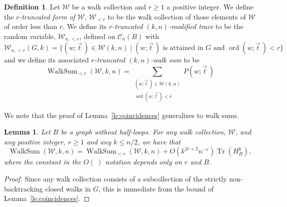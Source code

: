 \documentclass{memo-l}
\newenvironment{jfnote}{ \bgroup \color{blue} }{\egroup}
\newcommand{\mynote}[1]{\begin{jfnote}#1\end{jfnote}}
\theoremstyle{plain}
\theoremstyle{definition}
\numberwithin{section}{chapter}
\numberwithin{equation}{chapter}
\DeclareMathOperator{\ord}{ord}
\DeclareMathOperator{\WalkSum}{WalkSum}
\DeclareMathOperator{\Tr}{Tr}
\newcommand{\potwalk}{(w;\vec t\,)}
\theoremstyle{plain}
\newtheorem{lem}[theorem]{Lemma}
\theoremstyle{definition}
\newtheorem{defn}[theorem]{Definition}
\newcommand\cC{\mathcal{C}}
\newcommand\cW{\mathcal{W}}
\begin{document}
\begin{defn}\label{de:truncate_walk_collections}
Let \( \cW \) be a walk collection and \(r \geq 1\) a positive
integer. 
We define the {\em $r$-truncated form of $\cW$},
$\cW_{<r}$ to be the walk collection
of those elements of $\cW$ of order less than $r$.
We define its \emph{\(r\)-truncated \( (k,n) \)-modified trace} to
be the random variable, \( \cW_{n, <r} \), defined on \( \cC_n(B) \) with
\[ \cW_{n,<r}(G,k) = \{ \potwalk \in \cW(k,n) \mid \potwalk \text{ is
attained in } G \text{ and } \ord\potwalk < r \} \] and we define its
associated \emph{\(r\)-truncated \((k,n)\)-walk sum} to be \[
\WalkSum_{<r}(\cW,k,n) = \sum_{\substack{\potwalk \in \cW(k,n)\\
\ord\potwalk < r}}\!\!\!\!\! P\potwalk \] \end{defn}


We note that the proof of Lemma~\ref{le:coincidences} generalizes to
walk sums.
\begin{lem}\label{le:walk_sum_coincidences}
Let $B$ be a graph without half-loops.
For any walk collection, \( \cW \), and any positive integer,
\( r \geq 1 \) and any $k\le n/2$, we have that 
\[ 
\WalkSum(\cW,k,n) = \WalkSum_{<r}(\cW,k,n)
+ O({k^{2r+2} n^{-r}}) \Tr(H_B^k), \] 
where the constant in the $O(\ )$ notation depends only on $r$ and $B$.
\end{lem} 
\begin{proof}
Since any walk collection consists of a subcollection of the strictly
non-backtracking closed walks in $G$, this is immediate from
the bound of Lemma~\ref{le:coincidences}.
\end{proof}
\end{document}
